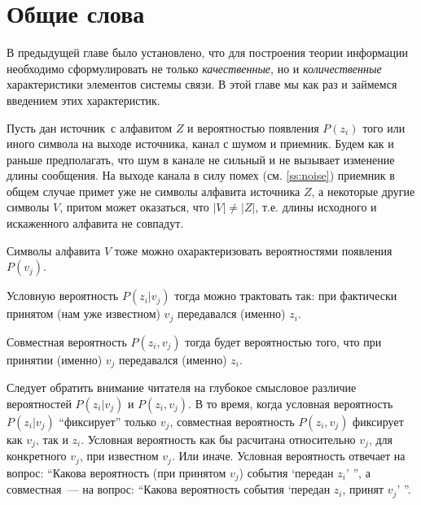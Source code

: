 \documentclass[12pt,a4paper,openright]{book}
\theoremstyle{definition}
\numberwithin{equation}{chapter}
\begin{document}
	\section{Общие слова}

	В предыдущей главе было установлено, что для построения теории информации необходимо сформулировать не только \textit{качественные}, но и \textit{количественные} характеристики элементов системы связи. В этой главе мы как раз и займемся введением этих характеристик.

	Пусть дан источник\footnotemark\ с алфавитом $Z$ и вероятностью появления $P(z_i)$ того или иного символа на выходе источника, канал с шумом и приемник. Будем как и раньше предполагать, что шум в канале не сильный и не вызывает изменение длины сообщения. На выходе канала в силу помех (см. \autoref{ss:noise}) приемник в общем случае примет уже не символы алфавита источника $Z$, а некоторые другие символы $V$, притом может оказаться, что $|V| \neq |Z|$, т.е. длины исходного и искаженного алфавита не совпадут.


	Символы алфавита $V$ тоже можно охарактеризовать вероятностями появления $P(v_j)$.

	Условную вероятность $P(z_i | v_j)$ тогда можно трактовать так: при фактически принятом (нам уже известном) $v_j$ передавался (именно) $z_i$.

	Совместная вероятность $P(z_i, v_j)$ тогда будет вероятностью того, что при принятии (именно) $v_j$ передавался (именно) $z_i$.

	Следует обратить внимание читателя на глубокое смысловое различие вероятностей $P(z_i | v_j)$ и $P(z_i, v_j)$. В то время, когда условная вероятность $P(z_i | v_j)$ ``фиксирует'' только $v_j$, совместная вероятность $P(z_i, v_j)$ фиксирует как $v_j$, так и $z_i$. Условная вероятность как бы расчитана относительно $v_j$, для конкретного $v_j$, при известном $v_j$. Или иначе. Условная вероятность отвечает на вопрос: ``Какова вероятность (при принятом $v_j$) события `передан $z_i$' '', а совместная~--- на вопрос: ``Какова вероятность события `передан $z_i$, принят $v_j$' ''.
\end{document}
